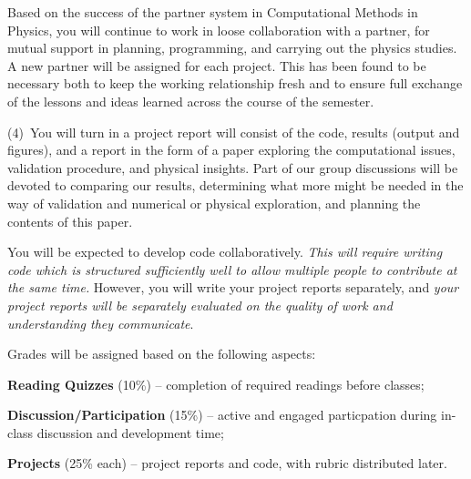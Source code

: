 \documentclass[12pt]{mcplain}
\begin{document}
\begin{leftindent}
  Based on the success of the partner system in Computational Methods in
  Physics, you will continue to work in loose collaboration with a partner, for
  mutual support in planning, programming, and carrying out the physics studies.
  A new partner will be assigned for each project.  This has been found to be
  necessary both to keep the working relationship fresh and to ensure full
  exchange of the lessons and ideas learned across the course of the semester.

  (4)~You will turn in a  project report will consist of the code, results
  (output and figures), and a report in the form of a paper exploring the
  computational issues, validation procedure, and physical insights. Part of our
  group discussions will be devoted to comparing our results, determining what
  more might be needed in the way of validation and numerical or physical
  exploration, and planning the contents of this paper.

  You will be expected to develop code collaboratively. \textit{This will
  require writing code which is structured sufficiently well to allow multiple
  people to contribute at the same time.} However, you will write your project
  reports separately, and \textit{your project reports will be separately
  evaluated on the quality of work and understanding they communicate}.

  \end{leftindent}


Grades will be assigned based on the following aspects:

\begin{leftindentlist*}{\baselineskip}

 \item \textbf{Reading Quizzes} (10\%) -- completion of required readings before
 classes;

 \item \textbf{Discussion/Participation} (15\%) -- active and engaged
 particpation during in-class discussion and development time;

 \item \textbf{Projects} (25\% each) -- project reports and code, with rubric
 distributed later.

\end{leftindentlist*}

\end{document}
